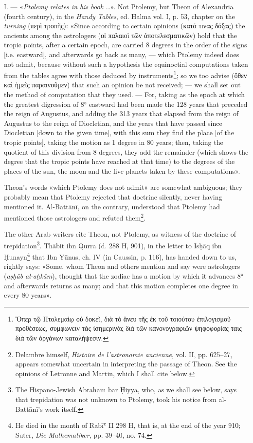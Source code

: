 \documentclass[11pt]{article}
\begin{document}
\par I. — «\emph{Ptolemy relates in his book …}». Not Ptolemy, but Theon of Alexandria (fourth century), in the \emph{Handy Tables}, ed. Halma vol. I, p. 53, chapter on the \emph{turning} ({\greekfont περὶ τροπῆς}): «Since according to certain opinions ({\greekfont κατά τινας δόξας}) the ancients among the astrologers ({\greekfont οἱ παλαιοὶ τῶν ἀποτελεσματικῶν}) hold that the tropic points, after a certain epoch, are carried 8 degrees in the order of the signs [i.e. eastward], and afterwards go back as many, — which Ptolemy indeed does not admit, because without such a hypothesis the equinoctial computations taken from the tables agree with those deduced by instruments\footnote{{\greekfont Ὅπερ τῷ Πτολεμαίῳ οὐ δοκεῖ, διὰ τὸ ἄνευ τῆς ἐκ τοῦ τοιούτου ἐπιλογισμοῦ προθέσεως, συμφωνειν τὰς ἰσημερινὰς διὰ τῶν κανονογραφιῶν ψηφοφορίας ταις διὰ τῶν ὀργάνων καταλήψεσιν}.}; so we too advise ({\greekfont ὅθεν καὶ ἡμεῖς παραινοῦμεν}) that such an opinion be not received; — we shall set out the method of computation that they used. — For, taking as the epoch at which the greatest digression of 8° eastward had been made the 128 years that preceded the reign of Augustus, and adding the 313 years that elapsed from the reign of Augustus to the reign of Diocletian, and the years that have passed since Diocletian [down to the given time], with this sum they find the place [of the tropic points], taking the motion as 1 degree in 80 years; then, taking the quotient of this division from 8 degrees, they add the remainder (which shows the degree that the tropic points have reached at that time) to the degrees of the places of the sun, the moon and the five planets taken by these computations».\par
\par Theon's words «which Ptolemy does not admit» are somewhat ambiguous; they probably mean that Ptolemy rejected that doctrine silently, never having mentioned it. Al-Battānī, on the contrary, understood that Ptolemy had mentioned those astrologers and refuted them\footnote{Delambre himself, \emph{Histoire de l'astronomie ancienne}, vol. II, pp. 625–27, appears somewhat uncertain in interpreting the passage of Theon. See the opinions of Letronne and Martin, which I shall cite below.}.\par
\par The other Arab writers cite Theon, not Ptolemy, as witness of the doctrine of trepidation\footnote{The Hispano-Jewish Abraham bar Ḥiyya, who, as we shall see below, says that trepidation was not unknown to Ptolemy, took his notice from al-Battānī's work itself.}. Thābit ibn Qurra (d. 288 H, 901), in the letter to Isḥāq ibn Ḥunayn\footnote{He died in the month of Rabīʿ II 298 H, that is, at the end of the year 910; Suter, \emph{Die Mathematiker}, pp. 39–40, no. 74.} that Ibn Yūnus, ch. IV (in Caussin, p. 116), has handed down to us, rightly says: «Some, whom Theon and others mention and say were astrologers (\emph{aṣḥāb al-aḥkām}), thought that the zodiac has a motion by which it advances 8° and afterwards returns as many; and that this motion completes one degree in every 80 years».\par
\end{document}
